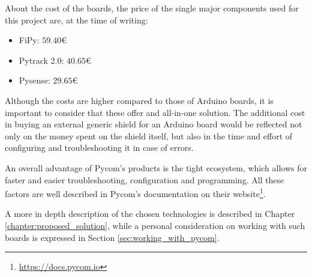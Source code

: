 			About the cost of the boards, the price of the single major components used for this project are, at the time of writing:
			\begin{itemize}
				\item FiPy: $59.40$€
				\item Pytrack 2.0: $40.65$€
				\item Pysense: $29.65$€
			\end{itemize}
			
			Although the costs are higher compared to those of Arduino boards, it is important to consider that these offer and all-in-one solution.
			The additional cost in buying an external generic shield for an Arduino board would be reflected not only on the money spent on the shield itself, but also in the time and effort of configuring and troubleshooting it in case of errors.
			
			An overall advantage of Pycom's products is the tight ecosystem, which allows for faster and easier troubleshooting, configuration and programming.
			All these factors are well described in Pycom's documentation on their website\footnote{ \url{https://docs.pycom.io}}.
			
			A more in depth description of the chosen technologies is described in Chapter \ref{chapter:proposed_solution}, while a personal consideration on working with such boards is expressed in Section \ref{sec:working_with_pycom}.